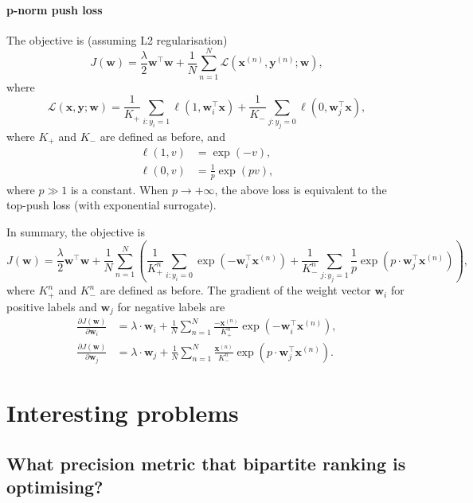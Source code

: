 \documentclass[9pt]{extarticle}
\newcommand{\x}{\mathbf{x}}
\newcommand{\y}{\mathbf{y}}
\newcommand{\1}{\mathbf{1}}
\newcommand{\w}{\mathbf{w}}
\newcommand{\LCal}{\mathcal{L}}
\newcommand{\pb}[1]{^{({#1})}}
\begin{document}
\paragraph{p-norm push loss}
The objective is (assuming L2 regularisation)
\begin{equation*}
J(\w) = \frac{\lambda}{2}\w^\top \w + \frac{1}{N} \sum_{n=1}^N \LCal(\x\pb{n}, \y\pb{n}; \w),
\end{equation*}
where
\begin{equation*}
\LCal(\x, \y; \w) = \frac{1}{K_+} \sum_{i:y_i=1} \ell(1, \w_i^\top \x) + \frac{1}{K_-} \sum_{j:y_j=0} \ell(0, \w_j^\top \x),
\end{equation*}
where $K_+$ and $K_-$ are defined as before, and
\begin{align}
\ell(1, v) & = \exp(-v), \\
\ell(0, v) & = \frac{1}{p} \exp(pv),
\end{align}
where $p \gg 1$ is a constant.
When $p \to +\infty$, the above loss is equivalent to the top-push loss (with exponential surrogate).

In summary, the objective is
\begin{equation}
\label{eq:obj_pnorm_push}
J(\w) = \frac{\lambda}{2} \w^\top \w + \frac{1}{N} \sum_{n=1}^N \left( \frac{1}{K_+^n} \sum_{i:y_i=0} \exp(-\w_i^\top \x\pb{n}) + 
        \frac{1}{K_-^n} \sum_{j:y_j=1} \frac{1}{p} \exp(p \cdot \w_j^\top \x\pb{n}) \right), 
\end{equation}
where $K_+^n$ and $K_-^n$ are defined as before.
The gradient of the weight vector $\w_i$ for positive labels and $\w_j$ for negative labels are
\begin{align}
\frac{\partial J(\w)}{\partial \w_i} & = \lambda \cdot \w_i + \frac{1}{N} \sum_{n=1}^N \frac{-\x\pb{n}}{K_+^n} \exp(-\w_i^\top \x\pb{n}), \\
\frac{\partial J(\w)}{\partial \w_j} & = \lambda \cdot \w_j + \frac{1}{N} \sum_{n=1}^N \frac{\x\pb{n}}{K_-^n} \exp(p \cdot \w_j^\top \x\pb{n}).
\end{align}




\newpage
\thispagestyle{empty}

\section*{Interesting problems}

\subsection*{What precision metric that bipartite ranking is optimising?}
\end{document}
